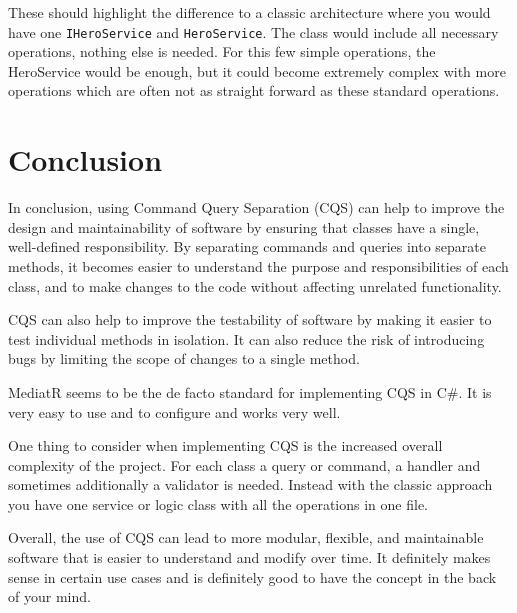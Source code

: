 \documentclass[11pt,conference]{IEEEtran}
\begin{document}
These should highlight the difference to a classic architecture where you would have one \texttt{IHeroService} and \texttt{HeroService}.
The class would include all necessary operations, nothing else is needed.
For this few simple operations, the HeroService would be enough, but it could become extremely complex with more operations which are often not as straight forward as these standard operations.

\section{Conclusion}

In conclusion, using Command Query Separation (CQS) can help to improve the design and maintainability of software by ensuring that classes have a single, well-defined responsibility. By separating commands and queries into separate methods, it becomes easier to understand the purpose and responsibilities of each class, and to make changes to the code without affecting unrelated functionality.

CQS can also help to improve the testability of software by making it easier to test individual methods in isolation. It can also reduce the risk of introducing bugs by limiting the scope of changes to a single method.

MediatR seems to be the de facto standard for implementing CQS in C\#.
It is very easy to use and to configure and works very well.

One thing to consider when implementing CQS is the increased overall complexity of the project.
For each class a query or command, a handler and sometimes additionally a validator is needed.
Instead with the classic approach you have one service or logic class with all the operations in one file.

Overall, the use of CQS can lead to more modular, flexible, and maintainable software that is easier to understand and modify over time.
It definitely makes sense in certain use cases and is definitely good to have the concept in the back of your mind.

\printbibliography
\end{document}
